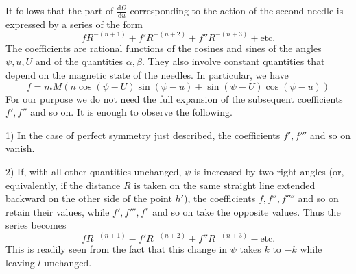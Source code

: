 It follows that the part of $\frac{\mathrm{d}\Omega}{\mathrm{d}u}$ corresponding to the action of the second needle is expressed by a series of the form
\[
fR^{-(n+1)}+f'R^{-(n+2)}+f''R^{-(n+3)}+\text{etc.}
\]
The coefficients are rational functions of the cosines and sines of the angles $\psi,u,U$ and of the quantities $\alpha,\beta$. They also involve constant quantities that depend on the magnetic state of the needles. In particular, we have
\[
f=mM(n\cos(\psi-U)\sin(\psi-u)+\sin(\psi-U)\cos(\psi-u))
\]
For our purpose we do not need the full expansion of the subsequent coefficients $f',f''$ and so on. It is enough to observe the following.

1) In the case of perfect symmetry just described, the coefficients $f',f'''$ and so on vanish.

2) If, with all other quantities unchanged, $\psi$ is increased by two right angles (or, equivalently, if the distance $R$ is taken on the same straight line extended backward on the other side of the point $h'$), the coefficients $f,f'',f''''$ and so on retain their values, while $f',f''',f^{\mathrm{v}}$ and so on take the opposite values. Thus the series becomes
\[
fR^{-(n+1)}-f'R^{-(n+2)}+f''R^{-(n+3)}-\text{etc.}
\]
This is readily seen from the fact that this change in $\psi$ takes $k$ to $-k$ while leaving $l$ unchanged.

